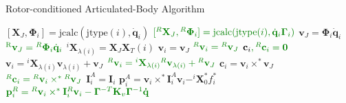 \clearpage
\begin{algorithm}
    \caption{Rotor-conditioned Articulated-Body Algorithm}
    \label{alg:rotaba}
    \begin{algorithmic}[1]
        \State $[\mathbf{X}_J, \boldsymbol{\Phi}_i] = \text{jcalc}(\text{jtype}(i), \dot{\mathbf{q}}_i)$
        \State $\color{webgreen}{[{} ^R\mathbf{X}_J, {} ^R\boldsymbol{\Phi}_i] = \text{jcalc}(\text{jtype}(i), \dot{\mathbf{q}}_i \boldsymbol{\Gamma} _i)}$
        \State $\mathrm{\mathbf{v}}_J = \boldsymbol{\Phi}_i \dot{\mathbf{q}}_i$
        \State $\color{webgreen}{\mathrm{{} ^R\mathbf{v}}_J = {} ^R\boldsymbol{\Phi}_i \dot{\mathbf{q}}_i}$
        \State $^i\mathbf{X}_{\lambda(i)} = \mathbf{X}_J\mathbf{X}_T (i)$
        \State $\mathrm{\mathbf{v}}_i = \mathrm{\mathbf{v}}_J$
        \State $\color{webgreen}{{}^R\mathrm{\mathbf{v}}_i = {}^R\mathrm{\mathbf{v}}_J}$
        \State $\mathbf{c}_i \color{webgreen}{,{}^R\mathbf{c}_i} = \mathbf{0}$
        \Else
        \State $\mathrm{\mathbf{v}}_i = {}^i\mathbf{X} _{\lambda(i)}\mathrm{\mathbf{v}}_{\lambda(i)} + \mathrm{\mathbf{v}}_J$
        \State $\color{webgreen}{{}^R\mathrm{\mathbf{v}}_i =  {}^i\mathbf{X} _{\lambda(i)} {}^R\mathrm{\mathbf{v}}_{\lambda(i)} + {}^R\mathrm{\mathbf{v}}_J}$
        \State $\mathbf{c}_i = \mathrm{\mathbf{v}}_i \times ^* \mathrm{\mathbf{v}}_J$
        \State $\color{webgreen}{{}^R\mathbf{c}_i = {}^R\mathrm{\mathbf{v}}_i \times ^* {}^R\mathrm{\mathbf{v}}_J}$
        \EndIf
        \State $\mathbf{I}_i ^A = \mathbf{I}_i$
        \State $\mathbf{p}_i ^A = \mathrm{\mathbf{v}}_i \times^* \mathbf{I}_i ^A \mathrm{\mathbf{v}}_i - ^i\mathbf{X} _0 ^* f ^* _i $
        \State $\color{webgreen}{\mathbf{p}_i ^R = {} ^R\mathrm{\mathbf{v}}_i \times^* \mathbf{I}_i ^R\mathrm{\mathbf{v}}_i - \boldsymbol{\Gamma} ^{-T}\mathbf{K}_v \boldsymbol{\Gamma} ^{-1} \mathbf{\dot{q}}}$
        \EndFor


\end{algorithmic}
\end{algorithm}
